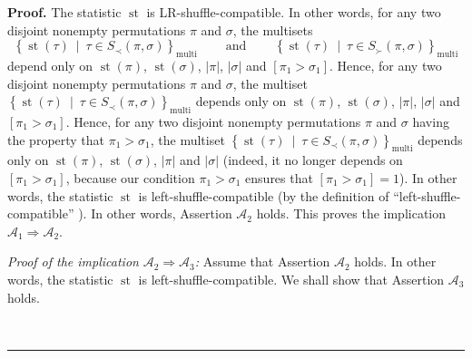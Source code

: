 \documentclass[numbers=enddot,12pt,final,onecolumn,notitlepage]{scrartcl}%
\theoremstyle{definition}
\newenvironment{proof}[1][Proof]{\noindent\textbf{#1.} }{\ \rule{0.5em}{0.5em}}
\newenvironment{verlong}{}{}
\begin{document}
\begin{verlong}
\begin{proof}
The statistic $\operatorname*{st}$ is LR-shuffle-compatible. In other words,
for any two disjoint nonempty permutations $\pi$ and $\sigma$, the multisets%
\[
\left\{  \operatorname*{st}\left(  \tau\right)  \ \mid\ \tau\in S_{\prec
}\left(  \pi,\sigma\right)  \right\}  _{\operatorname*{multi}}%
\ \ \ \ \ \ \ \ \ \ \text{and}\ \ \ \ \ \ \ \ \ \ \left\{  \operatorname*{st}%
\left(  \tau\right)  \ \mid\ \tau\in S_{\succ}\left(  \pi,\sigma\right)
\right\}  _{\operatorname*{multi}}%
\]
depend only on $\operatorname*{st}\left(  \pi\right)  $, $\operatorname*{st}%
\left(  \sigma\right)  $, $\left\vert \pi\right\vert $, $\left\vert
\sigma\right\vert $ and $\left[  \pi_{1}>\sigma_{1}\right]  $. Hence, for any
two disjoint nonempty permutations $\pi$ and $\sigma$, the multiset $\left\{
\operatorname*{st}\left(  \tau\right)  \ \mid\ \tau\in S_{\prec}\left(
\pi,\sigma\right)  \right\}  _{\operatorname*{multi}}$ depends only on
$\operatorname*{st}\left(  \pi\right)  $, $\operatorname*{st}\left(
\sigma\right)  $, $\left\vert \pi\right\vert $, $\left\vert \sigma\right\vert
$ and $\left[  \pi_{1}>\sigma_{1}\right]  $. Hence, for any two disjoint
nonempty permutations $\pi$ and $\sigma$ having the property that $\pi
_{1}>\sigma_{1}$, the multiset \newline$\left\{  \operatorname*{st}\left(
\tau\right)  \ \mid\ \tau\in S_{\prec}\left(  \pi,\sigma\right)  \right\}
_{\operatorname*{multi}}$ depends only on $\operatorname*{st}\left(
\pi\right)  $, $\operatorname*{st}\left(  \sigma\right)  $, $\left\vert
\pi\right\vert $ and $\left\vert \sigma\right\vert $ (indeed, it no longer
depends on $\left[  \pi_{1}>\sigma_{1}\right]  $, because our condition
$\pi_{1}>\sigma_{1}$ ensures that $\left[  \pi_{1}>\sigma_{1}\right]  =1$). In
other words, the statistic $\operatorname*{st}$ is left-shuffle-compatible (by
the definition of \textquotedblleft left-shuffle-compatible\textquotedblright%
). In other words, Assertion $\mathcal{A}_{2}$ holds. This proves the
implication $\mathcal{A}_{1}\Longrightarrow\mathcal{A}_{2}$.

\textit{Proof of the implication }$\mathcal{A}_{2}\Longrightarrow
\mathcal{A}_{3}$\textit{:} Assume that Assertion $\mathcal{A}_{2}$ holds. In
other words, the statistic $\operatorname*{st}$ is left-shuffle-compatible. We
shall show that Assertion $\mathcal{A}_{3}$ holds.


\end{proof}
\end{verlong}
\end{document}
